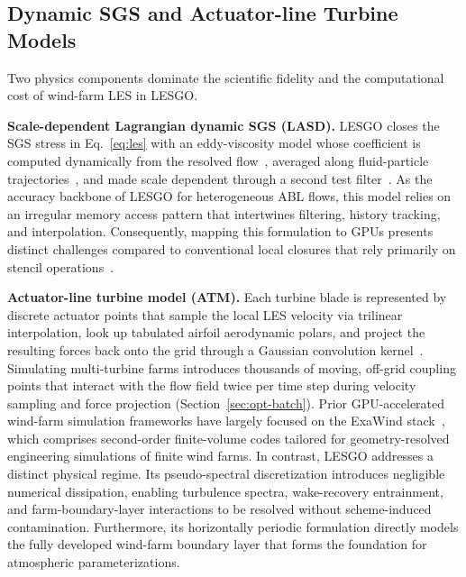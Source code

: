 \subsection{Dynamic SGS and Actuator-line Turbine Models}
\label{sec:bg-physics}

Two physics components dominate the scientific fidelity and the
computational cost of wind-farm LES in LESGO.

\vspace{0.08in}
\noindent\textbf{Scale-dependent Lagrangian dynamic SGS (LASD).} LESGO closes
the SGS stress in Eq.~\ref{eq:les} with an eddy-viscosity model whose
coefficient is computed dynamically from the resolved
flow~\cite{germano1991}, averaged along fluid-particle
trajectories~\cite{meneveau1996}, and made scale dependent through a
second test filter~\cite{porteagel2000,bouzeid2005}.
As the accuracy backbone of LESGO for
heterogeneous ABL flows, this model relies on an irregular memory access
pattern that intertwines filtering, history tracking, and interpolation.
Consequently, mapping this formulation to GPUs presents distinct
challenges compared to conventional local closures that rely
primarily on stencil operations~\cite{esclapez2025dales}.

\vspace{0.08in}
\noindent\textbf{Actuator-line turbine model (ATM).} Each turbine blade is
represented by discrete actuator points that sample the local LES
velocity via trilinear interpolation, look up tabulated airfoil
aerodynamic polars, and project the resulting forces back onto the grid
through a Gaussian convolution kernel~\cite{sorensen2002,martinez2015}.
Simulating multi-turbine farms introduces thousands of moving, off-grid
coupling points that interact with the flow field twice per time step
during velocity sampling and force projection (Section~\ref{sec:opt-batch}). 
Prior GPU-accelerated wind-farm simulation frameworks have largely 
focused on the ExaWind stack~\cite{sharma2024exawind,mullowney2021,kuhn2025amrwind}, 
which comprises second-order finite-volume codes tailored for 
geometry-resolved engineering simulations of finite wind farms. 
In contrast, LESGO addresses a distinct physical regime. Its 
pseudo-spectral discretization introduces negligible numerical dissipation, 
enabling turbulence spectra, wake-recovery entrainment, and 
farm-boundary-layer interactions to be resolved without scheme-induced 
contamination. Furthermore, its horizontally periodic formulation 
directly models the fully developed wind-farm boundary layer that 
forms the foundation for atmospheric parameterizations. 

